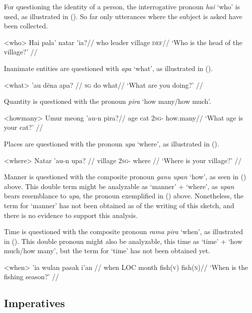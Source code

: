\documentclass[12pt]{article}
\begin{document}
For questioning the identity of a person, the interrogative pronoun \textit{hai} `who' is used, as illustrated in (). So far only utterances where the subject is asked have been collected.

\ex<who>
\begingl %
\gla Hai pala' natar 'ia?//
\glb who leader village \textsc{def}//
\glft `Who is the head of the village?' //
\endgl
\xe



Inanimate entities are questioned with \textit{apa} `what', as illustrated in ().

\ex<what>
\begingl %
\gla 'au dëna apa? //
\textsc{sg} do what//
\glft `What are you doing?' // 
\endgl
\xe


Quantity is questioned with the pronoun \textit{pira} `how many/how much'.

\ex<howmany>
\begingl %
\gla Umur meong 'au-n pira?//
\glb age cat 2\textsc{sg}-\Poss{} how.many//
\glft `What age is your cat?' // 
\endgl 
\xe


Places are questioned with the pronoun \textit{upa} `where', as illustrated in ().

\ex<where>
\begingl %
\gla Natar 'au-n upa? //
\glb village \textsc{2sg}-\Poss{} where //
\glft `Where is your village?' // 
\endgl
\xe 

Manner is questioned with the composite pronoun \textit{ganu upan} `how', as seen in () above. This double term might be analyzable as `manner' + `where', as \textit{upan} bears resemblance to \textit{upa}, the pronoun exemplified in () above. Nonetheless, the term for `manner' has not been obtained as of the writing of this sketch, and there is no evidence to support this analysis.

Time is questioned with the composite pronoun \textit{rama pira} `when', as illustrated in (). This double pronoun might also be analyzable, this time as `time' + `how much/how many', but the term for `time' has not been obtained yet.

\ex<when>
\begingl %
 'ia wulan pasak i'an //
\glb when \textsc{LOC} month fish(\textsc{v}) fish(\textsc{n})//
\glft `When is the fishing season?' // 
\endgl
\xe

\subsection{Imperatives}
\end{document}
